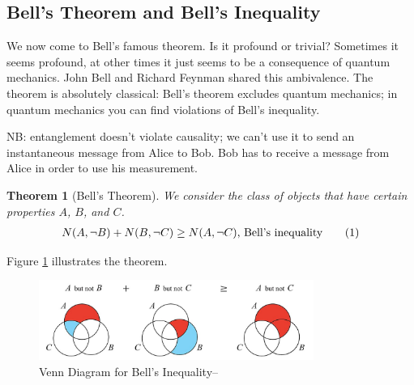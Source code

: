 \documentclass[]{article}
\newcommand\numberthis{\addtocounter{equation}{1}\tag{\theequation}}
\newtheorem{thm}{Theorem}
\begin{document}
\subsection{Bell's Theorem and Bell's Inequality}\label{sec:bell}

We now come to Bell's famous theorem\cite{bell1964einstein}. Is it profound or trivial? Sometimes it seems profound, at other times it just seems to be a consequence of quantum mechanics. John Bell and Richard Feynman shared this ambivalence. The theorem is absolutely classical:  Bell's theorem excludes quantum mechanics; in quantum mechanics you can find violations of Bell's inequality.

NB: entanglement doesn't violate causality; we can't use it to send an instantaneous message from Alice to Bob. Bob has to receive a message from Alice in order to use his measurement.

\begin{thm}[Bell's Theorem]
We consider the class of objects that have certain properties $A$, $B$, and $C$.
	\begin{align*}
		N(A, \neg B) + N(B, \neg C) \ge N(A,\neg C)\text{,  Bell's inequality} \numberthis \label{eq:bell:inequality}
	\end{align*}
\end{thm}

Figure \ref{fig:bell} illustrates the theorem.
\begin{figure}[H]
	\caption{Venn Diagram for Bell's Inequality--\cite{wiki2020bell}}\label{fig:bell}
	\includegraphics[width=0.8\textwidth]{1200px-Bell's_Theorem_JCB.jpg}
\end{figure}
\end{document}
